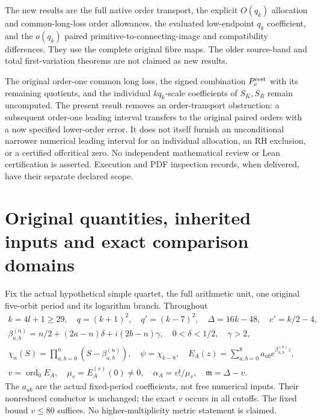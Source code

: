 \documentclass[11pt,a4paper]{article}
\renewcommand{\theequation}{QOT\arabic{equation}}
\begin{document}
The new results are the full native order transport, the explicit $O(q_k)$ allocation and common-long-loss order allowances, the evaluated low-endpoint $q_k$ coefficient, and the $o(q_k)$ paired primitive-to-connecting-image and compatibility differences. They use the complete original fibre maps. The older source-band and total first-variation theorems are not claimed as new results.

The original order-one common long loss, the signed combination $P_e^{\rm rest}$ with its remaining quotients, and the individual $kq_k$-scale coefficients of $S_K,S_R$ remain uncomputed. The present result removes an order-transport obstruction: a subsequent order-one leading interval transfers to the original paired orders with a now specified lower-order error. It does not itself furnish an unconditional narrower numerical leading interval for an individual allocation, an RH exclusion, or a certified offcritical zero. No independent mathematical review or Lean certification is asserted. Execution and PDF inspection records, when delivered, have their separate declared scope.


\clearpage
\begingroup
\setcounter{equation}{0}
\renewcommand{\theequation}{EOR\arabic{equation}}
\section{Original quantities, inherited inputs and exact comparison domains}
Fix the actual hypothetical simple quartet, the full arithmetic unit, one original
five-orbit period and its logarithm branch. Throughout
\begin{equation}
\begin{gathered}
 k=4l+1\ge29,\quad q=(k+1)^2,\quad q'=(k-7)^2,\quad
 \Delta=16k-48,\quad c'=k/2-4,\\
 \beta_{a,b}^{(n)}=n/2+(2a-n)\delta+i(2b-n)\gamma,
 \quad0<\delta<1/2,\quad\gamma>2,\\
 \chi_n(S)=\prod_{a,b=0}^n(S-\beta_{a,b}^{(n)}),\quad
 \psi=\chi_{k-8},\quad E_A(z)=\sum_{a,b=0}^8a_{ab}e^{\beta_{a,b}^{(8)}z},\\
 v=\operatorname{ord}_0E_A,\quad\mu_v=E_A^{(v)}(0)\ne0,
 \quad\alpha_A=v!/\mu_v,\quad\mathfrak m=\Delta-v.
\end{gathered}\label{eor:eq:data}
\end{equation}
The $a_{ab}$ are the actual fixed-period coefficients, not free numerical inputs.
Their nonreduced conductor is unchanged; the exact $v$ occurs in all cutoffs.
The fixed bound $v\le80$ suffices. No higher-multiplicity metric statement is claimed.
\end{document}
